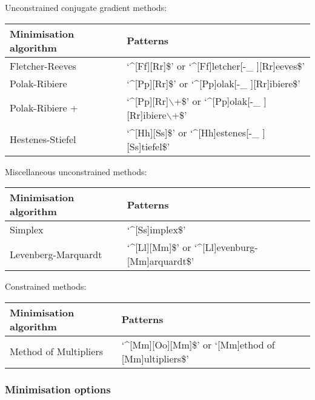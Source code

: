 Unconstrained conjugate gradient methods:


\begin{center}
\begin{tabular}{ll}
\toprule
Minimisation algorithm & Patterns \\
\midrule
 Fletcher-Reeves                    &  `\^{}[Ff][Rr]\$' or `\^{}[Ff]letcher[-\_ ][Rr]eeves\$'        \\
 Polak-Ribiere                      &  `\^{}[Pp][Rr]\$' or `\^{}[Pp]olak[-\_ ][Rr]ibiere\$'          \\
 Polak-Ribiere +                    &  `\^{}[Pp][Rr]$\backslash$+\$' or `\^{}[Pp]olak[-\_ ][Rr]ibiere$\backslash$+\$'      \\
 Hestenes-Stiefel                   &  `\^{}[Hh][Ss]\$' or `\^{}[Hh]estenes[-\_ ][Ss]tiefel\$'       \\
\bottomrule
\end{tabular}
\end{center}


Miscellaneous unconstrained methods:


\begin{center}
\begin{tabular}{ll}
\toprule
Minimisation algorithm & Patterns \\
\midrule
 Simplex                            &  `\^{}[Ss]implex\$'                                       \\
 Levenberg-Marquardt                &  `\^{}[Ll][Mm]\$' or `\^{}[Ll]evenburg-[Mm]arquardt\$'        \\
\bottomrule
\end{tabular}
\end{center}


Constrained methods:


\begin{center}
\begin{tabular}{ll}
\toprule
Minimisation algorithm & Patterns \\
\midrule
 Method of Multipliers              &  `\^{}[Mm][Oo][Mm]\$' or `[Mm]ethod of [Mm]ultipliers\$'   \\
\bottomrule
\end{tabular}
\end{center}



\subsubsection{Minimisation options}

